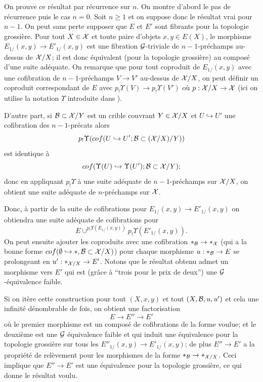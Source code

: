 \documentclass[12pt]{article}
\newcommand{\Gg}{{\cal G}}
\newcommand{\Bb}{{\cal B}}
\newcommand{\Xx}{{\cal X}}
\begin{document}
On prouve ce r\'esultat par r\'ecurrence sur $n$. On montre
d'abord le pas de
r\'ecurrence
puis le cas $n=0$. Soit $n\geq 1$ et on suppose donc le r\'esultat vrai
pour $n-1$. On peut sans perte supposer que $E$ et $E'$ sont fibrants pour la
topologie grossi\`ere. Pour tout $X\in \Xx$ et toute
paire d'objets $x,y\in E(X)$,
le morphisme $E_{1/} (x,y)\rightarrow E'_{1/}(x,y)$ est une fibration
$\Gg$-triviale de $n-1$-pr\'echamps au-dessus de $\Xx /X$; il
est donc
\'equivalent (pour la topologie grossi\`ere) au compos\'e d'une suite
ad\'equate. On remarque que pour tout coproduit de $E_{1/}(x,y)$ avec une
cofibration de $n-1$-pr\'echamps  $V\rightarrow V'$ au-dessus de $\Xx
/X$, on peut d\'efinir un coproduit correspondant de $E$ avec $p_!\Upsilon
(V)\rightarrow p_!\Upsilon (V')$ o\`u $p: \Xx /X \rightarrow \Xx$
(ici on utilise la notation $\Upsilon$ introduite dans \cite{limits}).

D'autre part, si $\Bb \subset \Xx /Y$ est un crible couvrant $Y\in \Xx /X$
et $U\hookrightarrow U'$ une cofibration des $n-1$-pr\'ecats alors
$$
p_! \Upsilon (cof(U\hookrightarrow U'; \Bb \subset (\Xx /X) / Y))
$$
est identique \`a
$$
cof(\Upsilon (U)\hookrightarrow \Upsilon (U'); \Bb \subset \Xx /Y);
$$
donc en appliquant $p_!\Upsilon $ \`a une suite ad\'equate
de $n-1$-pr\'echamps sur $\Xx /X$, on obtient une suite ad\'equate
de
$n$-pr\'echamps sur $\Xx$.

Donc, \`a partir de la suite de
cofibrations pour $E_{1/} (x,y)\rightarrow E'_{1/}(x,y)$ on obtiendra une suite
ad\'equate de cofibrations pour
$$
E\cup ^{p_! \Upsilon (E_{1/} (x,y))}p_! \Upsilon (E'_{1/} (x,y)).
$$
On peut ensuite ajouter
les coproduits avec une cofibration $\ast _{\Bb} \rightarrow \ast
_{\Xx}$ (qui a la bonne forme
$cof (\emptyset \hookrightarrow \ast , \Bb \subset \Xx /X )$)
pour chaque morphisme $u:\ast _{\Bb} \rightarrow E$ se
prolongeant en
$u':\ast _{\Xx /X}\rightarrow E'$.
Notons que le r\'esultat obtenu admet un morphisme vers $E'$ qui est
(gr\^ace \`a ``trois pour le prix de deux'') une $\Gg$-\'equivalence faible.

Si  on it\`ere cette construction pour
tout $(X,x,y)$ et tout $(X,\Bb ,u,u')$  et cela une infinit\'e d\'enombrable de
fois, on
obtient une factorisation
$$
E\rightarrow E'' \rightarrow E'
$$
o\`u le premier morphisme est un compos\'e de cofibrations de la
forme voulue; et
le deuxi\`eme est une $\Gg$ \'equivalence faible et qui induit une
\'equivalence pour la topologie grossi\`ere sur tous
les $E'' _{1/}(x,y)\rightarrow
E'_{1/}(x,y)$; de plus $E''\rightarrow E'$ a la propri\'et\'e de rel\`evement
pour les morphismes de la forme $\ast _{\Bb} \rightarrow \ast _{\Xx /X}$. Ceci
implique que $E'' \rightarrow E'$ est une \'equivalence pour la topologie
grossi\`ere, ce qui donne le r\'esultat voulu.
\end{document}
